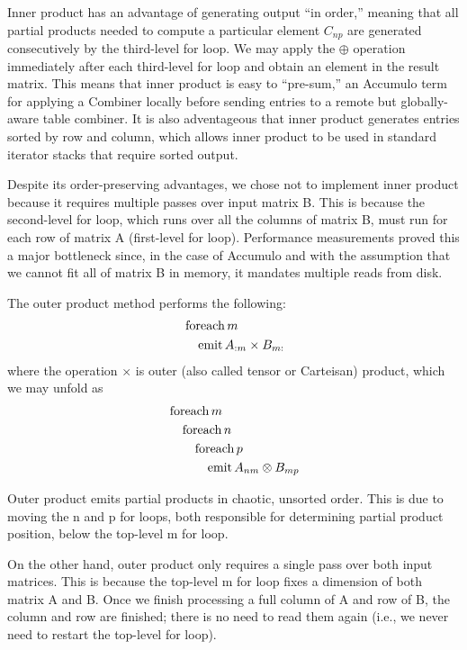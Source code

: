 Inner product has an advantage of generating output ``in order,'' meaning that all partial products needed 
to compute a particular element $C_{np}$ are generated consecutively by the third-level for loop.
We may apply the $\oplus$ operation immediately after each third-level for loop and obtain an element in the result matrix.
This means that inner product is easy to ``pre-sum,'' an Accumulo term for applying a Combiner
locally before sending entries to a remote but globally-aware table combiner.
It is also adventageous that inner product generates entries sorted by row 
and column, which allows inner product to be used in standard iterator stacks that require sorted output.

Despite its order-preserving advantages, we chose not to implement inner product because 
it requires multiple passes over input matrix B. This is because the second-level for loop, which runs over all the columns of
matrix B, must run for each row of matrix A (first-level for loop).
Performance measurements proved this a major bottleneck since, in the case of Accumulo
and with the assumption that we cannot fit all of matrix B in memory, it mandates multiple reads from disk.

The outer product method performs the following:
\begin{align*}
&\fore m \\
&\quad\emit A_{:m} \times B_{m:} 
\end{align*}
where the operation $\times$ is outer (also called tensor or Carteisan) product, which we may unfold as
\begin{align*}
&\operatorname{foreach} m \\
&\quad\operatorname{foreach} n \\
&\quad\quad\operatorname{foreach} p \\
&\quad\quad\quad\operatorname{emit} A_{nm} \otimes B_{mp} 
\end{align*}

Outer product emits partial products in chaotic, unsorted order.
This is due to moving the n and p for loops, both responsible for determining partial product position,
below the top-level m for loop.

On the other hand, outer product only requires a single pass over both input matrices.
This is because the top-level m for loop fixes a dimension of both matrix A and B.
Once we finish processing a full column of A and row of B, the column and row are finished;
there is no need to read them again (i.e., we never need to restart the top-level for loop).

